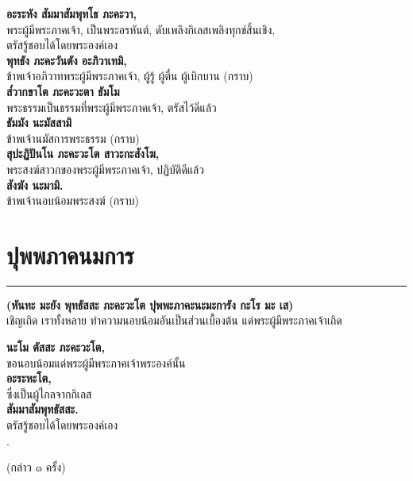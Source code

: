 \documentclass[12pt]{article}
\begin{document}
\textbf{อะระหัง สัมมาสัมพุทโธ ภะคะวา,}\\
\indent พระผู้มีพระภาคเจ้า, เป็นพระอรหันต์, ดับเพลิงกิเลสเพลิงทุกข์สิ้นเชิง,\\
\indent ตรัสรู้ชอบได้โดยพระองค์เอง\\
\textbf{พุทธัง ภะคะวันตัง อะภิวาเทมิ,}\\
\indent ข้าพเจ้าอภิวาทพระผู้มีพระภาคเจ้า, ผู้รู้ ผู้ตื่น ผู้เบิกบาน (กราบ)\\
\textbf{ส๎วากขาโต ภะคะวะตา ธัมโม}\\
\indent พระธรรมเป็นธรรมที่พระผู้มีพระภาคเจ้า, ตรัสไว้ดีแล้ว\\
\textbf{ธัมมัง นะมัสสามิ}\\
\indent ข้าพเจ้านมัสการพระธรรม (กราบ)\\
\textbf{สุปะฏิปันโน ภะคะวะโต สาวะกะสังโฆ,}\\
\indent พระสงฆ์สาวกของพระผู้มีพระภาคเจ้า, ปฏิบัติดีแล้ว\\
\textbf{สังฆัง นะมามิ.}\\
\indent ข้าพเจ้านอบน้อมพระสงฆ์ (กราบ)\\

\pagebreak

\section{ปุพพภาคนมการ}
\hrule
\begin{center}
\textbf{(หันทะ มะยัง พุทธัสสะ ภะคะวะโต ปุพพะภาคะนะมะการัง กะโร มะ เส)}\\
เชิญเถิด เราทั้งหลาย ทำความนอบน้อมอันเป็นส่วนเบื้องต้น แด่พระผู้มีพระภาคเจ้าเถิด
\end{center}
\textbf{นะโม ตัสสะ ภะคะวะโต,}\\
\indent ขอนอบน้อมแด่พระผู้มีพระภาคเจ้าพระองค์นั้น\\
\textbf{อะระหะโต,}\\
\indent ซึ่งเป็นผู้ไกลจากกิเลส\\
\textbf{สัมมาสัมพุทธัสสะ.}\\
\indent ตรัสรู้ชอบได้โดยพระองค์เอง\\.
\begin{center}
(กล่าว ๓ ครั้ง)
\end{center}

\pagebreak
\end{document}
